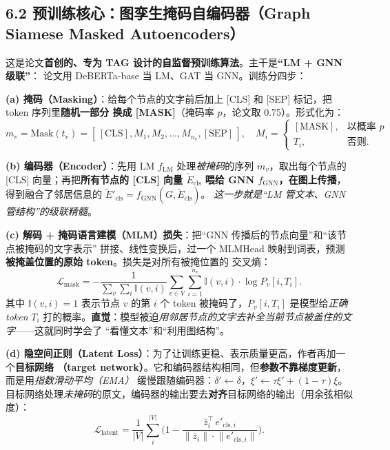\documentclass[11pt,UTF8,fontset=fandol]{ctexart}
\begin{document}
\subsection{6.2 预训练核心：图孪生掩码自编码器（Graph Siamese Masked Autoencoders）}

这是论文\textbf{首创的、专为 TAG 设计的自监督预训练算法}。主干是\textbf{“LM + GNN 级联”}：
论文用 DeBERTa-base 当 LM、GAT 当 GNN。训练分四步：

\textbf{(a) 掩码（Masking）}：给每个节点的文字前后加上 [CLS] 和 [SEP] 标记，把 token 序列里\textbf{随机一部分
换成 [MASK]}（掩码率 $p$，论文取 0.75）。形式化为：
\begin{equation*}
  m_v = \mathrm{Mask}(t_v) = [\,[\text{CLS}],M_1,M_2,\dots,M_{n_v},[\text{SEP}]\,],\quad
  M_i = \begin{cases} [\text{MASK}], & \text{以概率 } p\\ T_i, & \text{否则.}\end{cases}\tag{2}
\end{equation*}

\textbf{(b) 编码器（Encoder）}：先用 LM $f_{\text{LM}}$ 处理\emph{被掩码}的序列 $m_v$，取出每个节点的 [CLS]
向量；再把\textbf{所有节点的 [CLS] 向量 $\tilde{E}_{\text{cls}}$ 喂给 GNN $f_{\text{GNN}}$，在图上传播}，
得到融合了邻居信息的 $\tilde{E}'_{\text{cls}}=f_{\text{GNN}}(G,\tilde{E}_{\text{cls}})$。
\emph{这一步就是“LM 管文本、GNN 管结构”的级联精髓}。

\textbf{(c) 解码 + 掩码语言建模（MLM）损失}：把“GNN 传播后的节点向量”和“该节点被掩码的文字表示”
拼接、线性变换后，过一个 MLMHead 映射到词表，预测\textbf{被掩盖位置的原始 token}。损失是对所有被掩位置的
交叉熵：
\begin{equation*}
  \mathcal{L}_{\text{mask}}
  = -\frac{1}{\sum_v\sum_i \mathbb{I}(v,i)}
    \sum_{v\in V}\sum_{i=1}^{n_v}\mathbb{I}(v,i)\cdot \log P_v[i,T_i]. \tag{4}
\end{equation*}
其中 $\mathbb{I}(v,i)=1$ 表示节点 $v$ 的第 $i$ 个 token 被掩码了，$P_v[i,T_i]$ 是模型给\emph{正确 token} $T_i$
打的概率。\textbf{直觉}：模型被迫\emph{用邻居节点的文字去补全当前节点被盖住的文字}——这就同时学会了
“看懂文本”和“利用图结构”。

\textbf{(d) 隐空间正则（Latent Loss）}：为了让训练更稳、表示质量更高，作者再加一个\textbf{目标网络
（target network）}。它和编码器结构相同，但\textbf{参数不靠梯度更新}，而是用\emph{指数滑动平均（EMA）}
缓慢跟随编码器：$\delta'\!\leftarrow\!\delta$，$\xi'\!\leftarrow\!\tau\xi'+(1-\tau)\xi$。
目标网络处理\emph{未掩码}的原文，编码器的输出要去\textbf{对齐}目标网络的输出（用余弦相似度）：
\begin{equation*}
  \mathcal{L}_{\text{latent}}
  = \frac{1}{|V|}\sum_{i}^{|V|}
    \Big(1-\frac{\bar{z}_i^{\top}\, e'_{\text{cls},i}}{\lVert \bar{z}_i\rVert\cdot \lVert e'_{\text{cls},i}\rVert}\Big). \tag{5}
\end{equation*}
\end{document}
